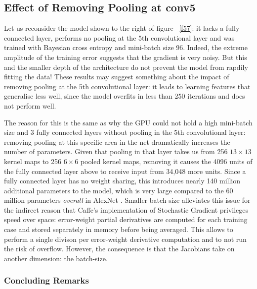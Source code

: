 \documentclass[a4paper,11pt]{article}
\begin{document}
\subsection{Effect of Removing Pooling at conv5}

Let us reconsider the model shown to the right of figure ~\ref{f57}: it lacks a fully connected layer, performs no pooling at the 5th convolutional layer and was trained with Bayesian cross entropy and mini-batch size 96. Indeed, the extreme amplitude of the training error suggests that the gradient is very noisy. But this and the smaller depth of the architecture do not prevent the model from rapdily fitting the data! These results may suggest something about the impact of removing pooling at the 5th convolutional layer: it leads to learning features that generalise less well, since the model overfits in less than 250 iterations and does not perform well. 

The reason for this is the same as why the GPU could not hold a high mini-batch size and 3 fully connected layers without pooling in the 5th convolutional layer: removing pooling at this specific area in the net dramatically increases the number of parameters. Given that pooling in that layer takes us from 256 $13\times13$ kernel maps to 256 $6\times6$ pooled kernel maps, removing it causes the 4096 units of the fully connected layer above to receive input from 34,048 more units. Since a fully connected layer has no weight sharing, this introduces nearly 140 million additional parameters to the model, which is very large compared to the 60 million parameters \textit{overall} in AlexNet \cite{krizhevsky}. Smaller batch-size alleviates this issue for the indirect reason that Caffe's implementation of Stochastic Gradient privileges speed over space: error-weight partial derivatives are computed for each training case and stored separately in memory before being averaged. This allows to perform a single divison per error-weight derivative computation and to not run the risk of overflow. However, the consequence is that the Jacobians take on another dimension: the batch-size. 




\subsubsection{Concluding Remarks}
\end{document}
